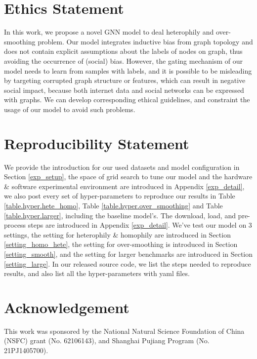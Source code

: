 \documentclass{article}
\begin{document}
\section{Ethics Statement}
In this work, we propose a novel GNN model to deal heterophily and over-smoothing problem. Our model integrates inductive bias from graph topology and does not contain explicit assumptions about the labels of nodes on graph, thus avoiding the occurrence of (social) bias. However, the gating mechanism of our model needs to learn from samples with labels, and it is possible to be misleading by targeting corrupted graph structure or features, which can result in negative social impact, because both internet data and social networks can be expressed with graphs. We can develop corresponding ethical guidelines, and constraint the usage of our model to avoid such problems.




\section{Reproducibility Statement}
We provide the introduction for our used datasets and model configuration in Section \ref{exp_setup}, the space of grid search to tune our model and the hardware \& software experimental environment are introduced in Appendix \ref{exp_detail}, we also post every set of hyper-parameters to reproduce our results in Table \ref{table.hyper.hete_homo}, Table \ref{table.hyper.over_smoothing} and Table \ref{table.hyper.larger}, including the baseline model's. The download, load, and pre-process steps are introduced in Appendix \ref{exp_detail}. We've test our model on 3 settings, the setting for heterophily \& homophily are introduced in Section \ref{setting_homo_hete}, the setting for over-smoothing is introduced in Section \ref{setting_smooth}, and the setting for larger benchmarks are introduced in Section \ref{setting_large}. In our released source code, we list the steps needed to reproduce results, and also list all the hyper-parameters with yaml files.

\section*{Acknowledgement}
This work was sponsored by the National Natural Science Foundation of China (NSFC) grant (No.
62106143), and Shanghai Pujiang Program (No. 21PJ1405700). 
\end{document}
